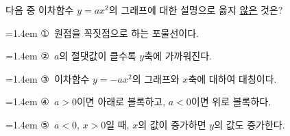 다음 중 이차함수 $y=ax^2$의 그래프에 대한 설명으로 옳지 \underline{않은} 것은? 
\par\medskip\par\noindent\hangindent=1.4em {\small ①}\ 원점을 꼭짓점으로 하는 포물선이다.\par\noindent\hangindent=1.4em {\small ②}\ $a$의 절댓값이 클수록 $y$축에 가까워진다.\par\noindent\hangindent=1.4em {\small ③}\ 이차함수 $y=-ax^2$의 그래프와 $x$축에 대하여 대칭이다.\par\noindent\hangindent=1.4em {\small ④}\ $a>0$이면 아래로 볼록하고, $a<0$이면 위로 볼록하다.\par\noindent\hangindent=1.4em {\small ⑤}\ $a<0$, $x>0$일 때, $x$의 값이 증가하면 $y$의 값도 증가한다.\par\medskip
